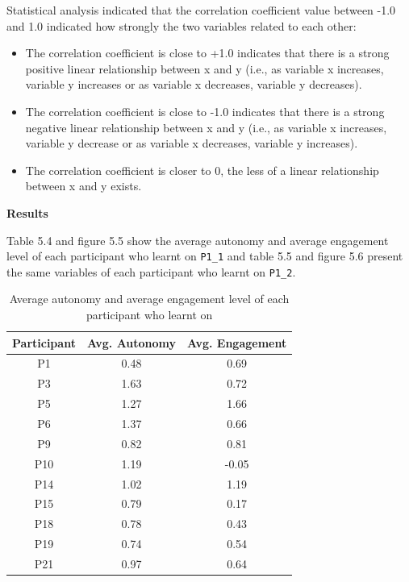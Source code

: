 Statistical analysis indicated that the correlation coefficient value between -1.0 and 1.0 indicated how strongly the two variables related to each other: 
\begin{itemize}
\item The correlation coefficient is close to +1.0 indicates that there is a strong positive linear relationship between x and y (i.e., as variable x increases, variable y increases or as variable x decreases, variable y decreases).
\item The correlation coefficient is close to -1.0 indicates that there is a strong negative linear relationship between x and y (i.e., as variable x increases, variable y decrease or as variable x decreases, variable y increases).
\item The correlation coefficient is closer to 0, the less of a linear relationship between x and y exists.
\end{itemize}

\noindent\textbf{Results} 

Table 5.4 and figure 5.5 show the average autonomy and average engagement level of each participant who learnt on \verb|P1_1| and table 5.5 and figure 5.6 present the same variables of each participant who learnt on \verb|P1_2|. 

\newpage
\begin{table}[H]
\centering
\caption{Average autonomy and average engagement level of each participant who learnt on }

\begin{tabular}{|c|c|c|} \hline
 Participant & Avg. Autonomy & Avg. Engagement \\
\hline
P1& 0.48 & 0.69  \\
\hline 
P3& 1.63 & 0.72 \\
\hline
P5& 1.27  & 1.66 \\
\hline 
P6& 1.37  & 0.66 \\
\hline
P9&0.82  & 0.81 \\
\hline 
P10& 1.19 & -0.05  \\
\hline
P14& 1.02  & 1.19 \\
\hline 
P15& 0.79 & 0.17 \\
\hline
P18& 0.78 & 0.43 \\
\hline 
P19& 0.74 & 0.54 \\
\hline
P21& 0.97 & 0.64 \\
\hline
\end{tabular}
\end{table}


